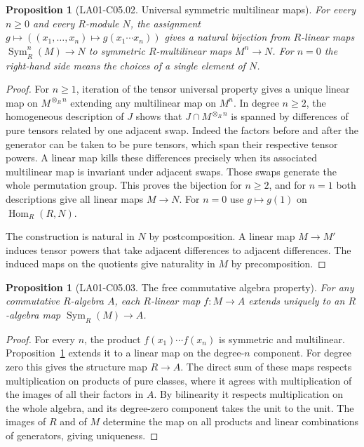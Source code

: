 \documentclass[11pt,oneside,openany]{book}
\newtheorem{proposition}[theorem]{Proposition}
\theoremstyle{definition}
\theoremstyle{remark}
\begin{document}
\begin{proposition}[LA01-C05.02. Universal symmetric multilinear maps]
\label{prop:la01-symmetric-multilinear}
For every \(n\ge 0\) and every \(R\)-module \(N\), the assignment
\(g\mapsto ((x_1,\ldots,x_n)\mapsto g(x_1\cdots x_n))\) gives a natural
bijection from \(R\)-linear maps \(\operatorname{Sym}^n_R(M)\to N\)
to symmetric \(R\)-multilinear maps \(M^n\to N\). For \(n=0\) the
right-hand side means the choices of a single element of \(N\).
\end{proposition}
\begin{proof}
For \(n\ge 1\), iteration of the tensor universal property
gives a unique linear map on \(M^{\otimes_R n}\) extending any
multilinear map on \(M^n\). In degree \(n\ge 2\), the homogeneous
description of \(J\) shows that \(J\cap M^{\otimes_R n}\) is spanned
by differences of pure tensors related by one adjacent swap.
Indeed the factors before and after the generator can be taken
to be pure tensors, which span their respective tensor powers.
A linear map kills these differences precisely when its associated
multilinear map is invariant under adjacent swaps. Those swaps
generate the whole permutation group. This proves the bijection
for \(n\ge 2\), and for \(n=1\) both descriptions give all linear
maps \(M\to N\). For \(n=0\) use \(g\mapsto g(1)\) on
\(\operatorname{Hom}_R(R,N)\).

The construction is natural in \(N\) by postcomposition. A
linear map \(M\to M'\) induces tensor powers that take adjacent
differences to adjacent differences. The induced maps on the
quotients give naturality in \(M\) by precomposition.
\end{proof}

\begin{proposition}[LA01-C05.03. The free commutative algebra property]
\label{prop:la01-symmetric-free}
For any commutative \(R\)-algebra \(A\), each \(R\)-linear map
\(f\colon M\to A\) extends uniquely to an \(R\)-algebra map
\(\operatorname{Sym}_R(M)\to A\).
\end{proposition}
\begin{proof}
For every \(n\), the product \(f(x_1)\cdots f(x_n)\) is symmetric
and multilinear. Proposition~\ref{prop:la01-symmetric-multilinear}
extends it to a linear map on the degree-\(n\) component.
For degree zero this gives the structure map \(R\to A\).
The direct sum of these maps respects multiplication on products
of pure classes, where it agrees with multiplication of the images
of all their factors in \(A\). By bilinearity it respects
multiplication on the whole algebra, and its degree-zero component
takes the unit to the unit. The images of \(R\) and of \(M\)
determine the map on all products and linear combinations of
generators, giving uniqueness.
\end{proof}
\end{document}
